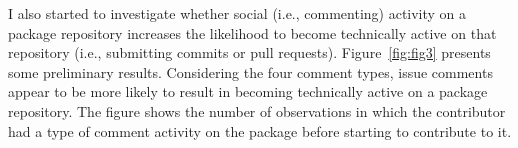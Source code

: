 I also started to investigate whether social (i.e., commenting) activity on a package repository increases the likelihood to become technically active on that repository (i.e., submitting commits or pull requests). 
Figure~\ref{fig:fig3} presents some preliminary results. Considering the four comment types, issue comments appear to be more likely to result in becoming technically active on a package repository.
The figure shows the number of observations in which the contributor had a type of comment activity on the package before starting to contribute to it.




